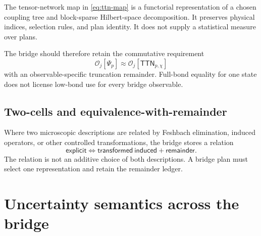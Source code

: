 \documentclass[11pt]{article}
\newcommand{\cO}{\mathcal O}
\begin{document}
The tensor-network map in \cref{eq:ttn-map} is a functorial representation of a chosen coupling tree and block-sparse Hilbert-space decomposition.  It preserves physical indices, selection rules, and plan identity.  It does not supply a statistical measure over plans.

The bridge should therefore retain the commutative requirement
\begin{equation}
 \cO_j[\Psi_p]
 \approx
 \cO_j[\mathsf{TTN}_{p,\chi}]
 \label{eq:ttn-observable-closure}
\end{equation}
with an observable-specific truncation remainder.  Full-bond equality for one state does not license low-bond use for every bridge observable.

\subsection{Two-cells and equivalence-with-remainder}

Where two microscopic descriptions are related by Feshbach elimination, induced operators, or other controlled transformations, the bridge stores a relation
\begin{equation}
 \mathsf{explicit}
 \Longleftrightarrow
 \mathsf{transformed\ induced}
 +\mathsf{remainder}.
 \label{eq:equivalence-remainder}
\end{equation}
The relation is not an additive choice of both descriptions.  A bridge plan must select one representation and retain the remainder ledger.

\section{Uncertainty semantics across the bridge}
\label{sec:uncertainty}
\end{document}
